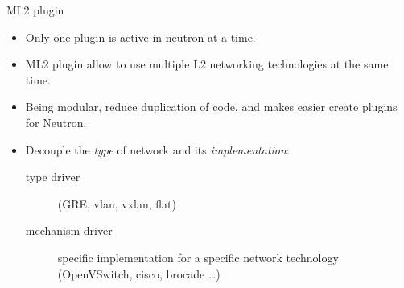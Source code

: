 \documentclass[english,serif,mathserif,xcolor=pdftex,dvipsnames,table]{beamer}
\begin{document}


\begin{frame}
  {ML2 plugin}
  \begin{itemize}
  \item Only one plugin is active in neutron at a time.
  \item ML2 plugin allow to use multiple L2 networking technologies at the
    same time.
  \item Being modular, reduce duplication of code, and makes easier create
    plugins for Neutron.

  \item Decouple the \textit{type} of network and its \textit{implementation}:
    \begin{description}
    \item[type driver] (GRE, vlan, vxlan, flat)
    \item[mechanism driver] specific implementation for a specific
      network technology (OpenVSwitch, cisco, brocade \ldots)
    \end{description}
  \end{itemize}
\end{frame}
\end{document}
